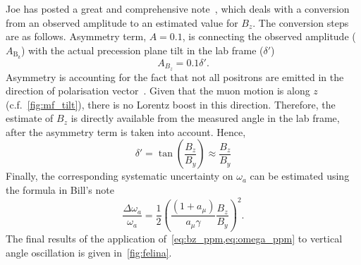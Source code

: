 \documentclass[12pt]{article}
\begin{document}
\clearpage
\thispagestyle{plain}
Joe has posted a great and comprehensive note~\cite{Joe_Gleb}, which deals with a conversion from an observed amplitude to an estimated value for $B_z$. The conversion steps are as follows. Asymmetry term, $A=0.1$, is connecting the observed amplitude ($A_{\mathrm{B_z}}$) with the actual precession plane tilt in the lab frame ($\delta '$)
\begin{equation}
    A_{B_z}=0.1\delta '.
\end{equation}
Asymmetry is accounting for the fact that not all positrons are emitted in the direction of polarisation vector~\cite{Joe_Gleb}. Given that the muon motion is along $z$ (c.f.~\cref{fig:mf_tilt}), there is no Lorentz boost in this direction. Therefore, the estimate of $B_z$ is directly available from the measured angle in the lab frame, after the asymmetry term is taken into account. Hence, 
\begin{equation}
    \delta ' = \tan(\frac{B_z}{B_y})  \approx \frac{B_z}{B_y}
    \label{eq:bz_ppm}
\end{equation}
Finally, the corresponding systematic uncertainty on $\omega_a$ can be estimated using the formula in Bill's note~\cite{Bill}
\begin{equation}
    \frac{\Delta \omega_a}{\omega_a} = \frac{1}{2}\left(\frac{(1+a_{\mu})}{a_{\mu}\gamma}\frac{B_z}{B_y}\right)^2.
    \label{eq:omega_ppm}
\end{equation}
The final results of the application of~\cref{eq:bz_ppm,eq:omega_ppm} to  vertical angle oscillation is given in~\cref{fig:felina}.

\clearpage
\thispagestyle{plain} 
\end{document}
